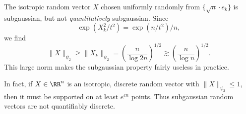 \begin{example}
    The isotropic random vector $X$ chosen uniformly randomly from $\{ \sqrt{n} \cdot e_k \}$ is subgaussian, but not \emph{quantitatively} subgaussian. Since
    \[ \exp \left( X_k^2/t^2 \right) = \exp(n/t^2)/n, \]
    we find
    \[ \| X \|_{\psi_2} \geq \| X_k \|_{\psi_2} = \left( \frac{n}{\log 2n} \right)^{1/2} \gtrsim \left( \frac{n}{\log n} \right)^{1/2}. \]
    This large norm makes the subgaussian property fairly useless in practice.
\end{example}

In fact, if $X \in \RR^n$ is an isotropic, discrete random vector with $\| X \|_{\psi_2} \leq 1$, then it must be supported on at least $e^{cn}$ points. Thus subgaussian random vectors are not quantifiably discrete.

